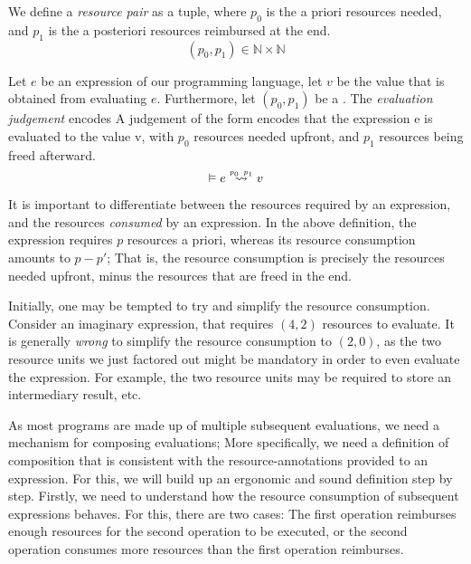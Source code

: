 \begin{definition}
   \label{def:resource-pair}
   We define a \emph{resource pair} as a tuple, where \(p_0\) is the a priori resources needed, and \(p_1\) is the a posteriori resources reimbursed at the end.
   \[
      (p_0, p_1) \in \mathbb{N} \times \mathbb{N}
   \]
\end{definition}

\begin{definition}\label{def:evaluation-judgement}
   Let \(e\) be an expression of our programming language, let \(v\) be the value that is obtained from evaluating \(e\). Furthermore, let \((p_0, p_1)\) be a .
   The \emph{evaluation judgement} encodes A judgement of the form  encodes that the expression e is evaluated to the value v, with \(p_0\) resources needed upfront, and \(p_1\) resources being freed afterward.
   \[
      \evals{}{e}{v}{p_0}{p_1}
   \]
\end{definition}

It is important to differentiate between the resources required by an expression, and the resources \emph{consumed} by an expression. In the above definition, the expression requires \(p\) resources a priori, whereas its resource consumption amounts to \(p - p'\); That is, the resource consumption is precisely the resources needed upfront, minus the resources that are freed in the end.

Initially, one may be tempted to try and simplify the resource consumption. Consider an imaginary expression, that requires \((4, 2)\) resources to evaluate. It is generally \emph{wrong} to simplify the resource consumption to \((2, 0)\), as the two resource units we just factored out might be mandatory in order to even evaluate the expression. For example, the two resource units may be required to store an intermediary result, etc. 

As most programs are made up of multiple subsequent evaluations, we need a mechanism for composing evaluations; More specifically, we need a definition of composition that is consistent with the resource-annotations provided to an expression.
For this, we will build up an ergonomic and sound definition step by step. Firstly, we need to understand how the resource consumption of subsequent expressions behaves. For this, there are two cases: The first operation reimburses enough resources for the second operation to be executed, or the second operation consumes more resources than the first operation reimburses. 

